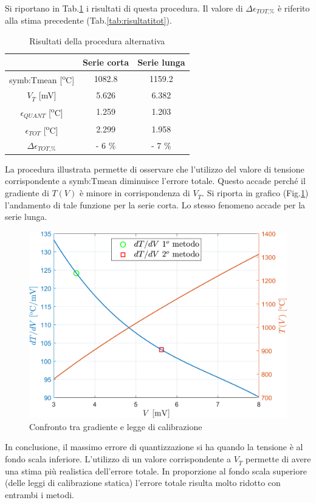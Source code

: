 Si riportano in Tab.\ref{tab:alternativa} i risultati di questa procedura. Il valore di $\Delta \epsilon_{\textit{TOT,\%}}$ è riferito alla stima precedente (Tab.\ref{tab:risultatitot}).

\begin{table}[H]
	\centering
	\begin{tabular}{c|c|c}
		\toprule
		\toprule
		& \textbf{Serie corta} & \textbf{Serie lunga}\\
		\midrule
		\gls{symb:Tmean} [\textsuperscript{o}C]& 1082.8 & 1159.2\\
		\midrule
		$V_{\overline{T}} $ [mV]& 5.626 & 6.382 \\
		\midrule
		$\epsilon_{\textit{QUANT}}$ [\textsuperscript{o}C]& 1.259 & 1.203 \\
		\midrule
		$\epsilon_{\textit{TOT}}$ [\textsuperscript{o}C]& 2.299 & 1.958\\
		\midrule
		$\Delta \epsilon_{\textit{TOT,\%}}$  & - 6 \% & - 7 \% \\
		\bottomrule
		\bottomrule
	\end{tabular}
	\caption{Risultati della procedura alternativa}
	\label{tab:alternativa}
\end{table}
La procedura illustrata permette di osservare che l'utilizzo del valore di tensione corrispondente a \gls{symb:Tmean} diminuisce l'errore totale. Questo accade perché il gradiente di $T(V)$ è minore in corrispondenza di $V_{\overline{T}}$. Si riporta in grafico (Fig.\ref{fig:confronto}) l'andamento di tale funzione per la serie corta. Lo stesso fenomeno accade per la serie lunga. 
\begin{figure}
	\centering
	\includegraphics[width=0.6\linewidth]{"../sperimentazione nei propulsori/confronto"}
	\caption{Confronto tra gradiente e legge di calibrazione}
	\label{fig:confronto}
\end{figure}

In conclusione, il massimo errore di quantizzazione si ha quando la tensione è al fondo scala inferiore. L'utilizzo di un valore corrispondente a $V_{\overline{T}}$
permette di avere una stima più realistica dell'errore totale. In proporzione al fondo scala superiore (delle leggi di calibrazione statica) l'errore totale risulta molto ridotto con entrambi i metodi. 